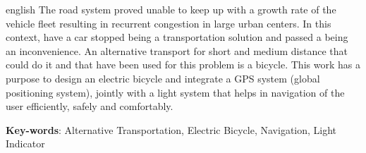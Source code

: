 \begin{resumo}[Abstract]
 \begin{otherlanguage*}{english}
The road system proved unable to keep up with a growth rate of the vehicle fleet resulting in recurrent congestion in large urban centers. In this context, have a car stopped being a  transportation solution and passed a being an inconvenience. An alternative transport for short and medium distance that could do it and that have been used for this problem is a bicycle. This work has a purpose to design an electric bicycle and integrate a GPS system (global positioning system), jointly with a light system that helps in navigation of the user efficiently, safely and comfortably.
   \vspace{\onelineskip}

   \noindent
   \textbf{Key-words}: Alternative Transportation, Electric Bicycle, Navigation, Light Indicator 
 \end{otherlanguage*}
\end{resumo}
